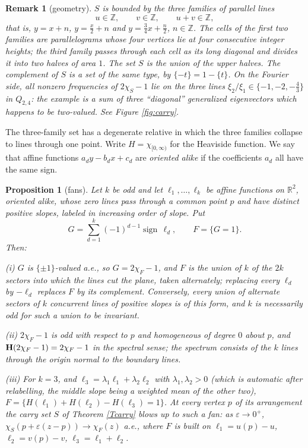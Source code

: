 \documentclass{article}
\newcommand{\tmop}[1]{\ensuremath{\operatorname{#1}}}
\newtheorem{proposition}{Proposition}
\newtheorem{remark}{Remark}
\def\H{{\bf H}}
\def\R{{\mathbb R}}
\def\Z{{\mathbb Z}}
\begin{document}
	\begin{remark}[geometry]\label{Rgeom}
		$S$ is bounded by the three families of parallel lines
		$$u\in\Z,\qquad v\in\Z,\qquad u+v\in\Z,$$
		that is, $y=x+n$, $y=\frac x2+n$ and $y=\frac 34x+\frac n2$, $n\in\Z$. The cells of the first two families are parallelograms whose four vertices lie at four consecutive integer heights; the third family passes through each cell as its long diagonal and divides it into two halves of area $1$. The set $S$ is the union of the upper halves. The complement of $S$ is a set of the same type, by $\{-t\}=1-\{t\}$. On the Fourier side, all nonzero frequencies of $2\chi_S-1$ lie on the three lines $\xi_2/\xi_1\in\{-1,-2,-\frac 43\}$ in $Q_{2,4}$: the example is a sum of three ``diagonal'' generalized eigenvectors which happens to be two-valued. See Figure \ref{fig:carry}.
	\end{remark}


	The three-family set has a degenerate relative in which the three families collapse to lines through one point. Write $H=\chi_{[0,\infty)}$ for the Heaviside function. We say that affine functions $a_dy-b_dx+c_d$ are \emph{oriented alike} if the coefficients $a_d$ all have the same sign.

	\begin{proposition}[fans]\label{Pfan}
		Let $k$ be odd and let $\ell_1,\dots,\ell_k$ be affine functions on $\R^2$, oriented alike, whose zero lines pass through a common point $p$ and have distinct positive slopes, labeled in increasing order of slope. Put
		$$G=\sum_{d=1}^k(-1)^{d-1}\tmop{sign}\,\ell_d,\qquad F=\{G=1\}.$$
		Then:

		(i) $G$ is $\{\pm1\}$-valued a.e., so $G=2\chi_F-1$, and $F$ is the union of $k$ of the $2k$ sectors into which the lines cut the plane, taken alternately; replacing every $\ell_d$ by $-\ell_d$ replaces $F$ by its complement. Conversely, every union of alternate sectors of $k$ concurrent lines of positive slopes is of this form, and $k$ is necessarily odd for such a union to be invariant.

		(ii) $2\chi_F-1$ is odd with respect to $p$ and homogeneous of degree $0$ about $p$, and $\H(2\chi_F-1)=2\chi_F-1$ in the spectral sense; the spectrum consists of the $k$ lines through the origin normal to the boundary lines.

		(iii) For $k=3$, and $\ell_3=\lambda_1\ell_1+\lambda_2\ell_2$ with $\lambda_1,\lambda_2>0$ (which is automatic after relabelling, the middle slope being a weighted mean of the other two), $F=\{H(\ell_1)+H(\ell_2)-H(\ell_3)=1\}$. At every vertex $p$ of its arrangement the carry set $S$ of Theorem \ref{Tcarry} blows up to such a fan: as $\varepsilon\to0^+$, $\chi_S(p+\varepsilon(z-p))\to\chi_{F}(z)$ a.e., where $F$ is built on $\ell_1=u(p)-u$, $\ell_2=v(p)-v$, $\ell_3=\ell_1+\ell_2$.
	\end{proposition}
\end{document}
